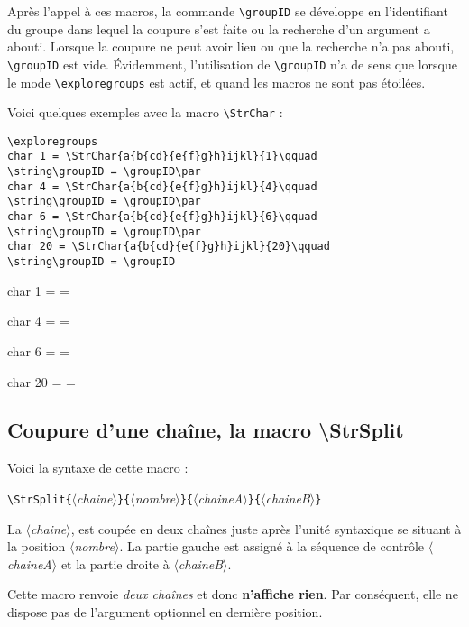 \documentclass[a4paper,10pt,french]{article}
\newcommand\argu[1]{$\langle$\textit{#1}$\rangle$}
\newcommand\ARGU[1]{\texttt{\color{black}\{}\argu{#1}\texttt{\color{black}\}}}
\newcommand\US{unité syntaxique\xspace}
\newcommand\styleexercice{\footnotesize}
\newcommand\verbinline{\lstinline[basicstyle=\normalsize\ttfamily]}
\begin{document}
Après l'appel à ces macros, la commande \verbinline|\groupID| se développe en l'identifiant du groupe dans lequel la coupure s'est faite ou la recherche d'un argument a abouti. Lorsque la coupure ne peut avoir lieu ou que la recherche n'a pas abouti, \verbinline|\groupID| est vide. Évidemment, l'utilisation de \verbinline|\groupID| n'a de sens que lorsque le mode \verbinline|\exploregroups| est actif, et quand les macros ne sont pas étoilées.\smallskip

Voici quelques exemples avec la macro \verbinline|\StrChar| :\par\nobreak\smallskip
\begin{minipage}[c]{0.65\linewidth}
\begin{lstlisting}
\exploregroups
char 1 = \StrChar{a{b{cd}{e{f}g}h}ijkl}{1}\qquad
\string\groupID = \groupID\par
char 4 = \StrChar{a{b{cd}{e{f}g}h}ijkl}{4}\qquad
\string\groupID = \groupID\par
char 6 = \StrChar{a{b{cd}{e{f}g}h}ijkl}{6}\qquad
\string\groupID = \groupID\par
char 20 = \StrChar{a{b{cd}{e{f}g}h}ijkl}{20}\qquad
\string\groupID = \groupID
\end{lstlisting}%
\end{minipage}\hfill
\begin{minipage}[c]{0.35\linewidth}
	\styleexercice
	\exploregroups
	char 1 = \qquad
	\string\groupID = \groupID\par
	char 4 = \qquad
	\string\groupID = \groupID\par
	char 6 = \qquad
	\string\groupID = \groupID\par
	char 20 = \qquad
	\string\groupID = \groupID
\end{minipage}

\subsection{Coupure d'une chaîne, la macro {\ttfamily\textbackslash StrSplit}}
\label{StrSplit}
Voici la syntaxe de cette macro :\par\nobreak\smallskip
\verbinline|\StrSplit|\ARGU{chaine}\ARGU{nombre}\ARGU{chaineA}\ARGU{chaineB}
\smallskip

La \argu{chaine}, est coupée en deux chaînes juste après l'\US se situant à la position \argu{nombre}. La partie gauche est assigné à la séquence de contrôle \argu{chaineA} et la partie droite à \argu{chaineB}.\par
Cette macro renvoie \emph{deux chaînes} et donc \textbf{n'affiche rien}. Par conséquent, elle ne dispose pas de l'argument optionnel en dernière position.\medskip
\end{document}
